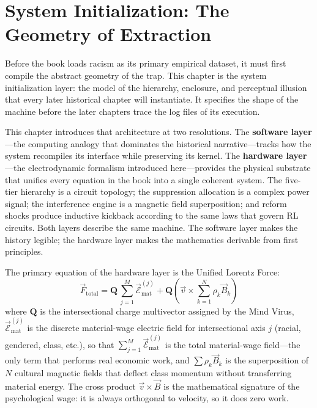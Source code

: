 \chapter{System Initialization: The Geometry of Extraction}
\label{ch:system_init}

Before the book loads racism as its primary empirical dataset, it must first
compile the abstract geometry of the trap. This chapter is the system
initialization layer: the model of the hierarchy, enclosure, and perceptual
illusion that every later historical chapter will instantiate. It specifies
the shape of the machine before the later chapters trace the log files of its
execution.

This chapter introduces that architecture at two resolutions. The
\textbf{software layer}---the computing analogy that dominates the historical
narrative---tracks how the system recompiles its interface while preserving its
kernel. The \textbf{hardware layer}---the electrodynamic formalism introduced
here---provides the physical substrate that unifies every equation in the book
into a single coherent system. The five-tier hierarchy is a circuit topology;
the suppression allocation is a complex power signal; the interference engine is
a magnetic field superposition; and reform shocks produce inductive kickback
according to the same laws that govern RL circuits. Both layers describe the
same machine. The software layer makes the history legible; the hardware layer
makes the mathematics derivable from first principles.

The primary equation of the hardware layer is the Unified Lorentz Force:
\begin{equation}\label{eq:0.1-unified-lorentz-force}
\vec{F}_{\text{total}} = \mathbf{Q}\,\sum_{j=1}^{M}\vec{\mathcal{E}}_{\text{mat}}^{(j)} + \mathbf{Q}\left(\vec{v} \times \sum_{k=1}^{N} \rho_k \vec{B}_k\right)
\end{equation}
where $\mathbf{Q}$ is the intersectional charge multivector assigned by the
Mind Virus, $\vec{\mathcal{E}}_{\text{mat}}^{(j)}$ is the discrete material-wage electric
field for intersectional axis $j$ (racial, gendered, class, etc.), so that
$\sum_{j=1}^{M}\vec{\mathcal{E}}_{\text{mat}}^{(j)}$ is the total material-wage field---the only term that performs real economic work, and $\sum \rho_k
\vec{B}_k$ is the superposition of $N$ cultural magnetic fields that deflect
class momentum without transferring material energy. The cross product
$\vec{v} \times \vec{B}$ is the mathematical signature of the psychological
wage: it is always orthogonal to velocity, so it does zero work.

